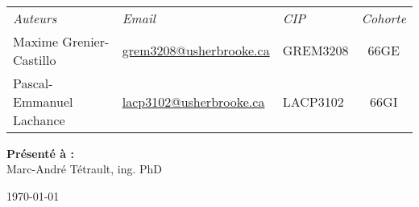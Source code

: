 \begin{titlepage}
\begin{center}

\vspace{0.5cm}
\textsc{\normalsize\faculte}\\[1.2cm]

\HRule\\[0.4cm]
{\huge\bfseries\doctitle}
\HRule\\[1.5cm]

\begin{tabulary}{\textwidth}{L L L C}
  \large\emph{Auteurs} & 
  \large\emph{Email} &
  \large\emph{CIP} & 
  \large\emph{Cohorte} \\[0.5cm]
  Maxime Grenier-Castillo & \href{mailto:grem3208@usherbrooke.ca}{grem3208@usherbrooke.ca} & GREM3208 & 66GE \\
  Pascal-Emmanuel Lachance & \href{mailto:lacp3102@usherbrooke.ca}{lacp3102@usherbrooke.ca} & LACP3102 & 66GI \\
\end{tabulary}

\vfill

\textbf{Présenté à :}\\
Marc-André Tétrault, ing. PhD\\
    
\vfill

{\large \today}

\end{center}
\end{titlepage}
